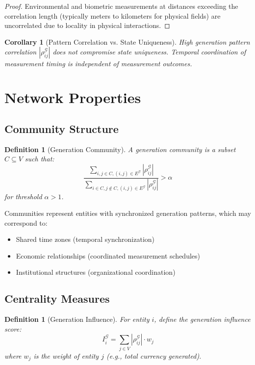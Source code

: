 \documentclass[12pt]{article}
\newtheorem{definition}[theorem]{Definition}
\newtheorem{corollary}[theorem]{Corollary}
\begin{document}
\begin{proof}
Environmental and biometric measurements at distances exceeding the correlation length (typically meters to kilometers for physical fields) are uncorrelated due to locality in physical interactions.
\end{proof}

\begin{corollary}[Pattern Correlation vs. State Uniqueness]
High generation pattern correlation $|\rho_{ij}^{\mathcal{G}}|$ does not compromise state uniqueness. Temporal coordination of measurement timing is independent of measurement outcomes.
\end{corollary}

\section{Network Properties}

\subsection{Community Structure}

\begin{definition}[Generation Community]
A generation community is a subset $C \subseteq V$ such that:
$$
\frac{\sum_{i,j \in C, (i,j) \in E^{\mathcal{G}}} |\rho_{ij}^{\mathcal{G}}|}{\sum_{i \in C, j \notin C, (i,j) \in E^{\mathcal{G}}} |\rho_{ij}^{\mathcal{G}}|} > \alpha
$$
for threshold $\alpha > 1$.
\end{definition}

Communities represent entities with synchronized generation patterns, which may correspond to:
\begin{itemize}
    \item Shared time zones (temporal synchronization)
    \item Economic relationships (coordinated measurement schedules)
    \item Institutional structures (organizational coordination)
\end{itemize}

\subsection{Centrality Measures}

\begin{definition}[Generation Influence]
For entity $i$, define the generation influence score:
$$
I_i^{\mathcal{G}} = \sum_{j \in V} |\rho_{ij}^{\mathcal{G}}| \cdot w_j
$$
where $w_j$ is the weight of entity $j$ (e.g., total currency generated).
\end{definition}
\end{document}
